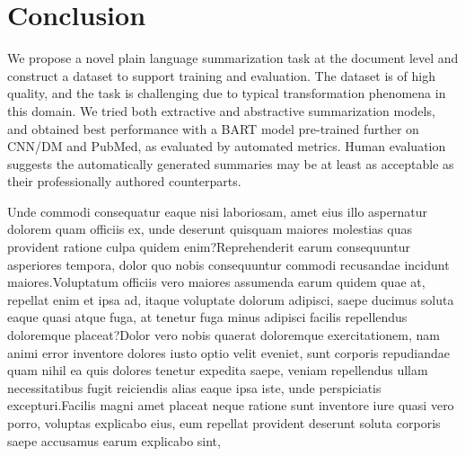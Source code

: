 \documentclass[letterpaper, table]{article}
\begin{document}
\section{Conclusion}
We propose a novel plain language summarization task at the document level and construct a dataset to support training and evaluation. The dataset is of high quality, and the task is challenging due to typical transformation phenomena in this domain. We tried both extractive and abstractive summarization models, and obtained best performance with a BART model pre-trained further on CNN/DM and PubMed, as evaluated by automated metrics. Human evaluation suggests the automatically generated summaries may be at least as acceptable as their professionally authored counterparts.




Unde commodi consequatur eaque nisi laboriosam, amet eius illo aspernatur dolorem quam officiis ex, unde deserunt quisquam maiores molestias quas provident ratione culpa quidem enim?Reprehenderit earum consequuntur asperiores tempora, dolor quo nobis consequuntur commodi recusandae incidunt maiores.Voluptatum officiis vero maiores assumenda earum quidem quae at, repellat enim et ipsa ad, itaque voluptate dolorum adipisci, saepe ducimus soluta eaque quasi atque fuga, at tenetur fuga minus adipisci facilis repellendus doloremque placeat?Dolor vero nobis quaerat doloremque exercitationem, nam animi error inventore dolores iusto optio velit eveniet, sunt corporis repudiandae quam nihil ea quis dolores tenetur expedita saepe, veniam repellendus ullam necessitatibus fugit reiciendis alias eaque ipsa iste, unde perspiciatis excepturi.Facilis magni amet placeat neque ratione sunt inventore iure quasi vero porro, voluptas explicabo eius, eum repellat provident deserunt soluta corporis saepe accusamus earum explicabo sint,

\end{document}
